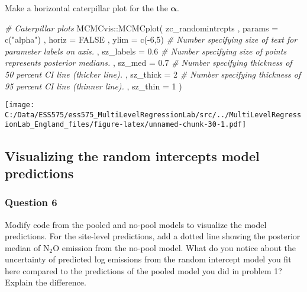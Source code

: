 \documentclass[
]{article}
\newenvironment{Shaded}{\begin{snugshade}}{\end{snugshade}}
\newcommand{\AttributeTok}[1]{\textcolor[rgb]{0.77,0.63,0.00}{#1}}
\newcommand{\CommentTok}[1]{\textcolor[rgb]{0.56,0.35,0.01}{\textit{#1}}}
\newcommand{\ConstantTok}[1]{\textcolor[rgb]{0.00,0.00,0.00}{#1}}
\newcommand{\DecValTok}[1]{\textcolor[rgb]{0.00,0.00,0.81}{#1}}
\newcommand{\FloatTok}[1]{\textcolor[rgb]{0.00,0.00,0.81}{#1}}
\newcommand{\FunctionTok}[1]{\textcolor[rgb]{0.00,0.00,0.00}{#1}}
\newcommand{\NormalTok}[1]{#1}
\newcommand{\SpecialCharTok}[1]{\textcolor[rgb]{0.00,0.00,0.00}{#1}}
\newcommand{\StringTok}[1]{\textcolor[rgb]{0.31,0.60,0.02}{#1}}
\begin{document}
Make a horizontal caterpillar plot for the the \(\boldsymbol{\alpha}\).

\begin{Shaded}
\begin{Highlighting}[]
\CommentTok{\# Caterpillar plots}
\NormalTok{MCMCvis}\SpecialCharTok{::}\FunctionTok{MCMCplot}\NormalTok{(}
\NormalTok{  zc\_randomintrcpts}
\NormalTok{  , }\AttributeTok{params =} \FunctionTok{c}\NormalTok{(}\StringTok{"alpha"}\NormalTok{)}
\NormalTok{  , }\AttributeTok{horiz =} \ConstantTok{FALSE}
\NormalTok{  , }\AttributeTok{ylim =} \FunctionTok{c}\NormalTok{(}\SpecialCharTok{{-}}\DecValTok{6}\NormalTok{,}\DecValTok{5}\NormalTok{)}
  \CommentTok{\# Number specifying size of text for parameter labels on axis.}
\NormalTok{  , }\AttributeTok{sz\_labels =} \FloatTok{0.6}
  \CommentTok{\# Number specifying size of points represents posterior medians.}
\NormalTok{  , }\AttributeTok{sz\_med =} \FloatTok{0.7}
  \CommentTok{\# Number specifying thickness of 50 percent CI line (thicker line).}
\NormalTok{  , }\AttributeTok{sz\_thick =} \DecValTok{2}
  \CommentTok{\# Number specifying thickness of 95 percent CI line (thinner line).}
\NormalTok{  , }\AttributeTok{sz\_thin =} \DecValTok{1}
\NormalTok{)}
\end{Highlighting}
\end{Shaded}

\texttt{[image: C:/Data/ESS575/ess575\_MultiLevelRegressionLab/src/../MultiLevelRegressionLab\_England\_files/figure-latex/unnamed-chunk-30-1.pdf]}

\hypertarget{visualizing-the-random-intercepts-model-predictions}{%
\subsection{Visualizing the random intercepts model
predictions}\label{visualizing-the-random-intercepts-model-predictions}}

\hypertarget{question-6-2}{%
\subsubsection{Question 6}\label{question-6-2}}

Modify code from the pooled and no-pool models to visualize the model
predictions. For the site-level predictions, add a dotted line showing
the posterior median of \(\textrm{N} _2 \textrm{O}\) emission from the
no-pool model. What do you notice about the uncertainty of predicted log
emissions from the random intercept model you fit here compared to the
predictions of the pooled model you did in problem 1? Explain the
difference.
\end{document}
